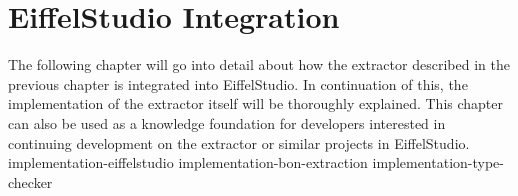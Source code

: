 \chapter{EiffelStudio Integration}
\label{eiffelstudio-integration}
The following chapter will go into detail about how the \bon{} extractor described in the previous chapter is integrated into EiffelStudio. In continuation of this, the implementation of the extractor itself will be thoroughly explained. This chapter can also be used as a knowledge foundation for developers interested in continuing development on the \bon{} extractor or similar projects in EiffelStudio.
{implementation-eiffelstudio}
{implementation-bon-extraction}
{implementation-type-checker}